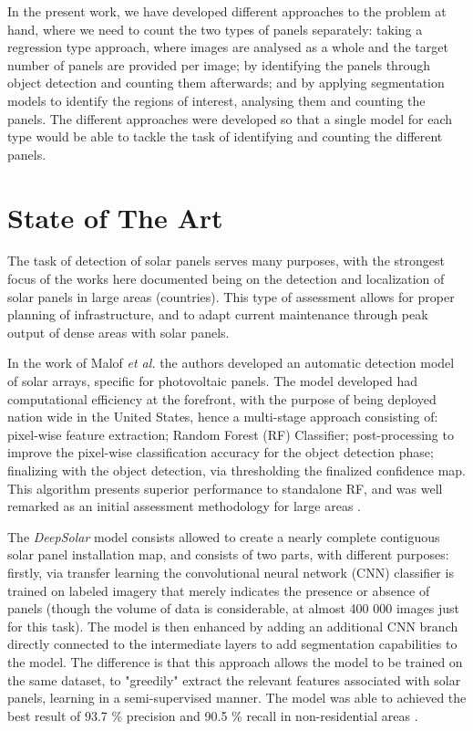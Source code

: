 \documentclass[conference]{IEEEtran}
\begin{document}
In the present work, we have developed different approaches to the problem at hand, where we need to count the two types of panels separately: taking a regression type approach, where images are analysed as a whole and the target number of panels are provided per image; by identifying the panels through object detection and counting them afterwards; and by applying segmentation models to identify the regions of interest, analysing them and counting the panels. The different approaches were developed so that a single model for each type would be able to tackle the task of identifying and counting the different panels.

\section{State of The Art}

The task of detection of solar panels serves many purposes, with the strongest focus of the works here documented being on the detection and localization of solar panels in large areas (countries). This type of assessment allows for proper planning of infrastructure, and to adapt current maintenance through peak output of dense areas with solar panels.

In the work of Malof \textit{et al.} the authors developed an automatic detection model of solar arrays, specific for photovoltaic panels. The model developed had computational efficiency at the forefront, with the purpose of being deployed nation wide in the United States, hence a multi-stage approach consisting of: pixel-wise feature extraction; Random Forest (RF) Classifier; post-processing to improve the pixel-wise classification accuracy for the object detection phase; finalizing with the object detection, via thresholding the finalized confidence map. This algorithm presents superior performance to standalone RF, and was well remarked as an initial assessment methodology for large areas \cite{Malof_2016}. 

The \textit{DeepSolar} model consists allowed to create a nearly complete contiguous solar panel installation map, and consists of two parts, with different purposes: firstly, via transfer learning the convolutional neural network (CNN) classifier is trained on labeled imagery that merely indicates the presence or absence of panels (though the volume of data is considerable, at almost 400 000 images just for this task). The model is then enhanced by adding an additional CNN branch directly connected to the intermediate layers to add segmentation capabilities to the model. The difference is that this approach allows the model to be trained on the same dataset, to "greedily" extract the relevant features associated with solar panels, learning in a semi-supervised manner. The model was able to achieved the best result of 93.7 \% precision and 90.5 \% recall in non-residential areas \cite{Yu2018DeepSolar}.
\end{document}
